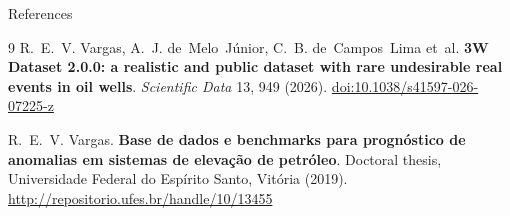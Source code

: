 
\begin{frame}{References}

  \small

  \vskip 7mm

  \begin{thebibliography}{9}
      R.~E.~V. Vargas, A.~J. de~Melo~J\'unior, C.~B. de~Campos~Lima et~al.
      \newblock \textbf{3W Dataset 2.0.0: a realistic and public dataset with rare undesirable real events in oil wells}.
      \newblock \emph{Scientific Data} 13, 949 (2026).
      \newblock \href{https://doi.org/10.1038/s41597-026-07225-z}{doi:10.1038/s41597-026-07225-z}

  \vskip 7mm

      R.~E.~V. Vargas.
      \newblock \textbf{Base de dados e benchmarks para prognóstico de anomalias em sistemas de
        elevação de petróleo}.
      \newblock Doctoral thesis, Universidade Federal do Espírito Santo, Vitória (2019).
      \newblock \url{http://repositorio.ufes.br/handle/10/13455}
  \end{thebibliography}
\end{frame}
